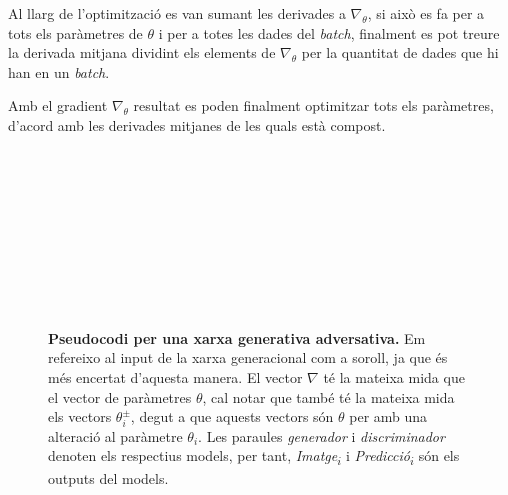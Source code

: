 Al llarg de l'optimització es van sumant les derivades a $\nabla_\theta$, si això es fa per a tots els paràmetres de $\theta$ i per a totes les dades del \textit{batch}, finalment es pot treure la derivada mitjana dividint els elements de $\nabla_{\theta}$ per la quantitat de dades que hi han en un \textit{batch}.

Amb el gradient $\nabla_{\theta}$ resultat es poden finalment optimitzar tots els paràmetres, d'acord amb les derivades mitjanes de les quals està compost. 
 
 
\begin{figure}
	\HRule \\[-.5cm]
	\begin{algorithmic}
		 
		 
		\\
		 
		\\
		 	 
		\\
		\\
		 
		\EndFor
		\EndFor
		\\
		 
		 
		\EndFor
	\end{algorithmic}
	\HRule \\[-.4cm]
	\caption{\textbf{Pseudocodi per una xarxa generativa adversativa.} Em refereixo al input de la xarxa generacional com a soroll, ja que és més encertat d'aquesta manera. El vector $\nabla$ té la mateixa mida que el vector de paràmetres $\theta$, cal notar que també té la mateixa mida els vectors $\theta^\pm_i$, degut a que aquests vectors són $\theta$ per amb una alteració al paràmetre $\theta_i$. Les paraules \textit{generador} i \textit{discriminador} denoten els respectius models, per tant, \textit{Imatge\textsubscript{$i$}} i \textit{Predicció\textsubscript{$i$}} són els outputs del models.}
	\label{fig:alg_gen}
\end{figure}

